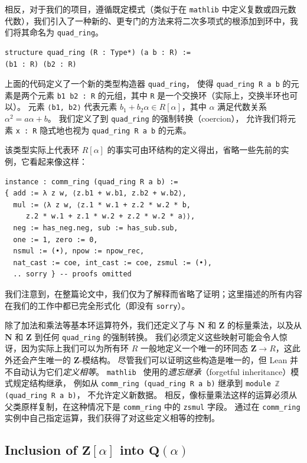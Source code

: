 \documentclass[sigplan,10pt,nonacm,
screen]{acmart} \settopmatter{printfolios=true,printccs=false,printacmref=false}
\newcommand{\mathlib}{\lstinline{mathlib}\xspace}
\newcommand{\QQ}{\mathbf{Q}}
\newcommand{\ZZ}{\mathbf{Z}}
\newcommand{\NN}{\mathbf{N}}
\begin{document}
相反，对于我们的项目，遵循既定模式（类似于在 \mathlib 中定义复数或四元数代数），我们引入了一种新的、更专门的方法来将二次多项式的根添加到环中，我们将其命名为 \lstinline{quad_ring}。
\begin{lstlisting}
structure quad_ring (R : Type*) (a b : R) :=
(b1 : R) (b2 : R)
\end{lstlisting}
上面的代码定义了一个新的类型构造器 \lstinline{quad_ring}，
使得 \lstinline{quad_ring R a b} 的元素是两个元素 \lstinline{b1 b2 : R} 的元组，其中 \lstinline{R} 是一个交换环（实际上，交换半环也可以）。
元素 \lstinline{⟨b1, b2⟩} 代表元素 $b_1 + b_2 \alpha \in R[\alpha]$，其中 $\alpha$ 满足代数关系 $\alpha^2=a\alpha+b$。
我们定义了到 \lstinline{quad_ring} 的强制转换（coercion），
允许我们将元素 \lstinline{x : R} 隐式地也视为 \lstinline{quad_ring R a b} 的元素。

该类型实际上代表环 $R[\alpha]$ 的事实可由环结构的定义得出，省略一些先前的实例，它看起来像这样：
\begin{lstlisting}
instance : comm_ring (quad_ring R a b) :=
{ add := λ z w, ⟨z.b1 + w.b1, z.b2 + w.b2⟩,
  mul := ⟨λ z w, ⟨z.1 * w.1 + z.2 * w.2 * b,
     z.2 * w.1 + z.1 * w.2 + z.2 * w.2 * a⟩⟩,
  neg := has_neg.neg, sub := has_sub.sub,
  one := 1, zero := 0,
  nsmul := (•), npow := npow_rec,
  nat_cast := coe, int_cast := coe, zsmul := (•),
  .. sorry } -- proofs omitted
\end{lstlisting}

我们注意到，在整篇论文中，我们仅为了解释而省略了证明；这里描述的所有内容在我们的工作中都已完全形式化（即没有 \lstinline{sorry}）。

除了加法和乘法等基本环运算符外，我们还定义了与 $\NN$ 和 $\ZZ$ 的标量乘法，以及从 $\NN$ 和 $\ZZ$ 到任何 \lstinline{quad_ring} 的强制转换。
我们必须定义这些映射可能会令人惊讶，因为实际上我们可以为所有环 $R$ 一般地定义一个唯一的环同态 $\ZZ \to R$，这此外还会产生唯一的 $\ZZ$-模结构。
尽管我们可以证明这些构造是唯一的，但 Lean 并不自动认为它们\emph{定义相等}。
\mathlib~\cite{Forgetful-inheritance,typeclasses} 使用的\emph{遗忘继承}（forgetful inheritance）模式规定结构继承，
例如从 \lstinline{comm_ring (quad_ring R a b)} 继承到 \lstinline{module ℤ (quad_ring R a b)}，
不允许定义新数据。
相反，像标量乘法这样的运算必须从父类原样复制，在这种情况下是 \lstinline{comm_ring} 中的 \lstinline{zsmul} 字段。
通过在 \lstinline{comm_ring} 实例中自己指定运算，我们获得了对这些定义相等的控制。

    \subsection{Inclusion of $\ZZ[\alpha]$ into $\QQ(\alpha)$} \label{sec:quad_ring_algebra}
\end{document}

